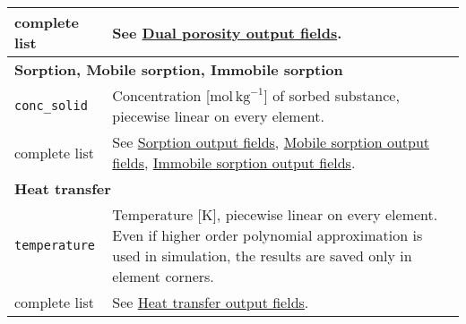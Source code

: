 \begin{tabular}{|l|p{10cm}|}
 \hline
complete list & See \hyperlink{IT::DualPorosity-Output}{Dual porosity output fields}.\\
\hline
% 
\multicolumn{2}{|l|}{\bf Sorption, Mobile sorption, Immobile sorption}\\
\hline
\tt conc\_solid & Concentration [mol\,$\mathrm{kg}^{-1}$] of sorbed substance, piecewise linear on every element.\\
 \hline
complete list & See \hyperlink{IT::Sorption-Output}{Sorption output fields}, \hyperlink{IT::SorptionMobile-Output}{Mobile sorption output fields}, \hyperlink{IT::SorptionImmobile-Output}{Immobile sorption output fields}.\\
\hline
% 
\multicolumn{2}{|l|}{\bf Heat transfer}\\
\hline
\tt temperature & Temperature [K], piecewise linear on every element. Even if higher order polynomial approximation is used in simulation, the results are saved only in element corners.\\
 \hline
complete list & See \hyperlink{IT::HeatTransfer-DG-Output}{Heat transfer output fields}.\\
\hline
\end{tabular}




% 



